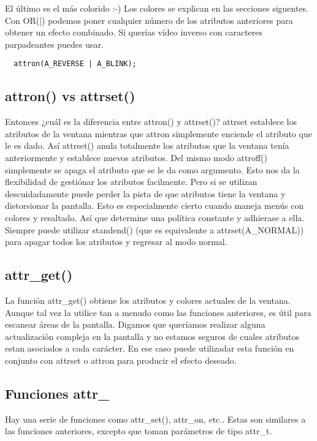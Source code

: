 \documentclass{article}
\begin{document}
El último es el más colorido :-) Los colores se explican en las secciones
siguentes.\\

Con OR(|) podemos poner cualquier número de los atributos anteriores para
obtener un efecto combinado. Si querías vídeo inverso con caracteres
parpadeantes puedes usar.\\


\begin{verbatim}
  attron(A_REVERSE | A_BLINK);
\end{verbatim}

\subsection{attron() vs attrset()}%
Entonces ¿cuál es la diferencia entre attron() y attrset()? attrset establece
los atributos de la ventana mientras que attron simplemente enciende el
atributo que le es dado. Así attrset() anula totalmente los atributos que la
ventana tenía anteriormente y establece nuevos atributos. Del mismo modo
attroff() simplemente se apaga el atributo que se le da como argumento. Esto
nos da la flexibilidad de gestiónar los atributos facilmente. Pero si se
utilizan descuidadamente puede perder la pista de que atributos tiene la
ventana y distorsionar la pantalla. Esto es especialmente cierto cuando maneja
menús con colores y resaltado. Así que determine una política constante y
adhierase a ella. Siempre puede utilizar standend() (que es equivalente a
attrset(A\_NORMAL)) para apagar todos los atributos y regresar al modo normal.

\subsection{attr\_get()}%
La función attr\_get() obtiene los atributos y colores actuales de la ventana.
Aunque tal vez la utilice tan a menudo como las funciones anteriores, es útil
para escanear áreas de la pantalla. Digamos que queríamos realizar alguna
actualización compleja en la pantalla y no estamos seguros de cuales atributos
estan asociados a cada carácter. En ese caso puede utilizadar esta función en
conjunto con attrset o attron para producir el efecto deseado.

\subsection{Funciones attr\_}%
Hay una serie de funciones como attr\_set(), attr\_on, etc.. Estas son similares
a las funciones anteriores, excepto que toman parámetros de tipo attr\_t.
\end{document}
